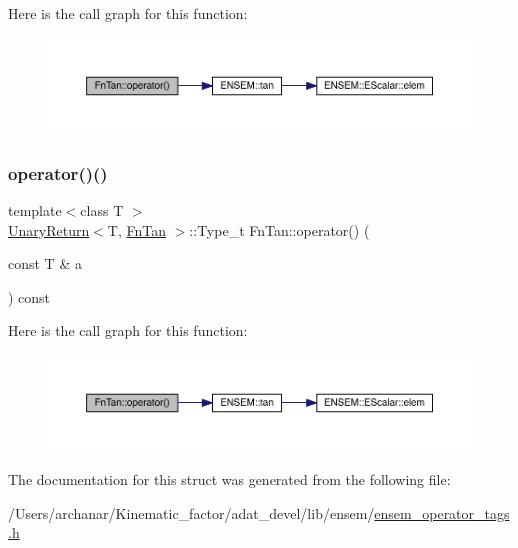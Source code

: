 Here is the call graph for this function\+:
\nopagebreak
\begin{figure}[H]
\begin{center}
\leavevmode
\includegraphics[width=350pt]{d8/dce/structFnTan_a067d849927778152282097f8efe5cdf1_cgraph}
\end{center}
\end{figure}
\mbox{\label{structFnTan_a067d849927778152282097f8efe5cdf1}} 
\subsubsection{\texorpdfstring{operator()()}{operator()()}\hspace{0.1cm}{\footnotesize\ttfamily [2/2]}}
{\footnotesize\ttfamily template$<$class T $>$ \\
\mbox{\hyperlink{structUnaryReturn}{Unary\+Return}}$<$T, \mbox{\hyperlink{structFnTan}{Fn\+Tan}} $>$\+::Type\+\_\+t Fn\+Tan\+::operator() (\begin{DoxyParamCaption}\item[{const T \&}]{a }\end{DoxyParamCaption}) const\hspace{0.3cm}{\ttfamily [inline]}}

Here is the call graph for this function\+:
\nopagebreak
\begin{figure}[H]
\begin{center}
\leavevmode
\includegraphics[width=350pt]{d8/dce/structFnTan_a067d849927778152282097f8efe5cdf1_cgraph}
\end{center}
\end{figure}


The documentation for this struct was generated from the following file\+:\begin{DoxyCompactItemize}
\item 
/\+Users/archanar/\+Kinematic\+\_\+factor/adat\+\_\+devel/lib/ensem/\mbox{\hyperlink{lib_2ensem_2ensem__operator__tags_8h}{ensem\+\_\+operator\+\_\+tags.\+h}}\end{DoxyCompactItemize}
